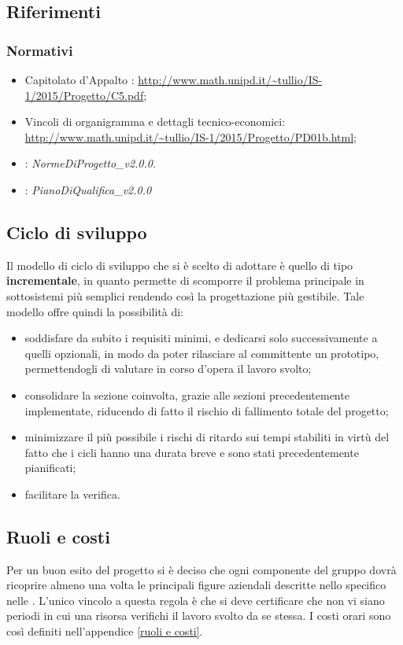 \documentclass[12pt,a4paper]{article}
\begin{document}
\subsection{Riferimenti}\label{riferimenti}

\subsubsection{Normativi}
\begin{itemize}
	\item Capitolato d’Appalto \prjL: \url{http://www.math.unipd.it/~tullio/IS-1/2015/Progetto/C5.pdf};
	\item Vincoli di organigramma e dettagli tecnico-economici: \url{http://www.math.unipd.it/~tullio/IS-1/2015/Progetto/PD01b.html};
	\item \NdP: \textit{NormeDiProgetto\_v2.0.0}. 
	\item \PdQ: \textit{PianoDiQualifica\_v2.0.0}
\end{itemize}

\subsection{Ciclo di sviluppo}
Il modello di ciclo di sviluppo che si è scelto di adottare è quello di tipo \textbf{incrementale}, in quanto permette di scomporre il problema principale in sottosistemi più semplici rendendo così la progettazione più gestibile. Tale modello offre quindi la possibilità di:
\begin{itemize}
	\item soddisfare da subito i requisiti minimi, e dedicarsi solo successivamente a quelli opzionali, in modo da poter rilasciare al committente un prototipo, permettendogli di valutare in corso d'opera il lavoro svolto;
	\item consolidare la sezione coinvolta, grazie alle sezioni precedentemente implementate, riducendo di fatto il rischio di fallimento totale del progetto;
	\item minimizzare il più possibile i rischi di ritardo sui tempi stabiliti in virtù del fatto che i cicli hanno una durata breve e sono stati precedentemente pianificati;
	\item facilitare la verifica.
\end{itemize}

\subsection{Ruoli e costi}
Per un buon esito del progetto si è deciso che ogni componente del gruppo dovrà ricoprire almeno una volta le principali figure aziendali descritte nello specifico nelle \NdP{}. L'unico vincolo a questa regola è che si deve certificare che non vi siano periodi in cui una risorsa verifichi il lavoro svolto da se stessa. I costi orari sono così definiti nell'appendice \ref{ruoli e costi}. 
\end{document}
